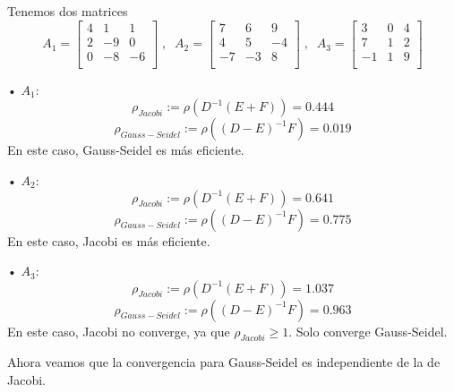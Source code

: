 \begin{ejemplo}
Tenemos dos matrices
\[
A_1 = \begin{bmatrix}
4 & 1 & 1 \\
2 & -9 & 0 \\
0 & -8 & -6 \\
\end{bmatrix}
\; , \; \;
A_2 = \begin{bmatrix}
7 & 6 & 9 \\
4 & 5 & -4 \\
-7 & -3 & 8 \\
\end{bmatrix}
\; , \; \;
A_3 = \begin{bmatrix}
3 & 0 & 4 \\
7 & 1 & 2 \\
-1 & 1 & 9 \\
\end{bmatrix}
\]
	\begin{nlist}
	\item[•] $A_1$:
	\[ \rho _{Jacobi} := \rho (D^{-1}(E+F)) = 0.444 \]
	\[ \rho _{Gauss-Seidel} := \rho ((D-E)^{-1}F) = 0.019 \]
	En este caso, Gauss-Seidel es más eficiente.
	\item[•] $A_2$:
	\[ \rho _{Jacobi} := \rho (D^{-1}(E+F)) = 0.641 \]
	\[ \rho _{Gauss-Seidel} := \rho ((D-E)^{-1}F) = 0.775 \]
	En este caso, Jacobi es más eficiente.
	\item[•] $A_3$:
	\[ \rho _{Jacobi} := \rho (D^{-1}(E+F)) = 1.037 \]
	\[ \rho _{Gauss-Seidel} := \rho ((D-E)^{-1}F) = 0.963 \]
	En este caso, Jacobi no converge, ya que $\rho _{Jacobi} \geq 1$. Solo converge Gauss-Seidel.
	\end{nlist}
\end{ejemplo}

Ahora veamos que la convergencia para Gauss-Seidel es independiente de la de Jacobi.


